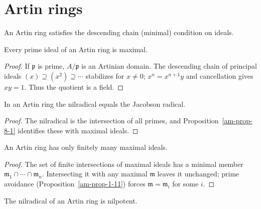 \section{Artin rings}
\label{am-ch8-artin}
\begin{definition}
\label{am-def-artin-ring}
\uses{}
An Artin ring satisfies the descending chain (minimal) condition on ideals.
\end{definition}
\begin{proposition}
\label{am-prop-8-1}
\uses{}
Every prime ideal of an Artin ring is maximal.
\end{proposition}
\begin{proof}
If $\mathfrak{p}$ is prime, $A/\mathfrak{p}$ is an Artinian domain.  The descending chain of
principal ideals $(x)\supseteq(x^2)\supseteq\cdots$ stabilizes for $x\ne0$;
$x^n=x^{n+1}y$ and cancellation gives $xy=1$.  Thus the quotient is a field.
\end{proof}
\begin{corollary}
\label{am-cor-8-2}
\uses{}
In an Artin ring the nilradical equals the Jacobson radical.
\end{corollary}
\begin{proof}
The nilradical is the intersection of all primes, and Proposition~\ref{am-prop-8-1}
identifies these with maximal ideals.
\end{proof}
\begin{proposition}
\label{am-prop-8-3}
\uses{}
An Artin ring has only finitely many maximal ideals.
\end{proposition}
\begin{proof}
The set of finite intersections of maximal ideals has a minimal member
$\mathfrak{m}_1\cap\cdots\cap\mathfrak{m}_n$.  Intersecting it with any maximal $\mathfrak{m}$ leaves it
unchanged; prime avoidance (Proposition~\ref{am-prop-1-11}) forces
$\mathfrak{m}=\mathfrak{m}_i$ for some $i$.
\end{proof}
\begin{proposition}
\label{am-prop-8-4}
\uses{}
The nilradical of an Artin ring is nilpotent.
\end{proposition}
